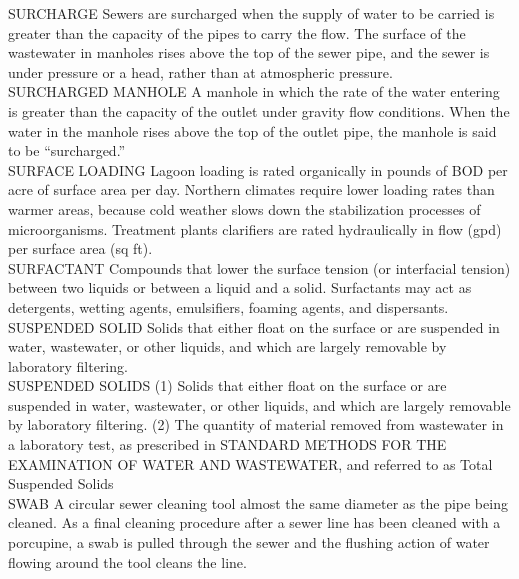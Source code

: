 SURCHARGE
Sewers are surcharged when the supply of water to be carried is greater than the capacity of the pipes to carry the flow. The surface of the wastewater in manholes rises above the top of the sewer pipe, and the sewer is under pressure or a head, rather than at atmospheric pressure. 
\vspace{0.3cm}\\
SURCHARGED MANHOLE
A manhole in which the rate of the water entering is greater than the capacity of the outlet under gravity flow conditions. When the water in the manhole rises above the top of the outlet pipe, the manhole is said to be “surcharged.” 
\vspace{0.3cm}\\
SURFACE LOADING
Lagoon loading is rated organically in pounds of BOD per acre of surface area per day. Northern climates require lower loading rates than warmer areas, because cold weather slows down the stabilization processes of microorganisms. Treatment plants clarifiers are rated hydraulically in flow (gpd) per surface area (sq ft).
\vspace{0.3cm}\\
SURFACTANT
Compounds that lower the surface tension (or interfacial tension) between two liquids or between a liquid and a solid. Surfactants may act as detergents, wetting agents, emulsifiers, foaming agents, and dispersants.
\vspace{0.3cm}\\
SUSPENDED SOLID
Solids that either float on the surface or are suspended in water, wastewater, or other liquids, and which are largely removable by laboratory filtering.
\vspace{0.3cm}\\
SUSPENDED SOLIDS
(1) Solids that either float on the surface or are suspended in water, wastewater, or other liquids, and which are largely removable by laboratory filtering. (2) The quantity of material removed from wastewater in a laboratory test, as prescribed in STANDARD METHODS FOR THE EXAMINATION OF WATER AND WASTEWATER, and referred to as Total Suspended Solids 
\vspace{0.3cm}\\
SWAB
A circular sewer cleaning tool almost the same diameter as the pipe being cleaned. As a final cleaning procedure after a sewer line has been cleaned with a porcupine, a swab is pulled through the sewer and the flushing action of water flowing around the tool cleans the line. 
\vspace{0.3cm}\\
